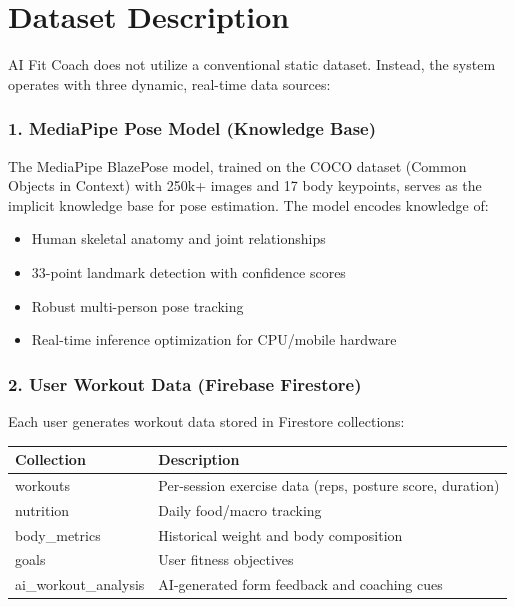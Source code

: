 \documentclass[12pt,a4paper]{article}
\begin{document}
\section{Dataset Description}

AI Fit Coach does not utilize a conventional static dataset. Instead, the system 
operates with three dynamic, real-time data sources:

\subsubsection*{1. MediaPipe Pose Model (Knowledge Base)}

The MediaPipe BlazePose model, trained on the COCO dataset (Common Objects in Context) 
with 250k+ images and 17 body keypoints, serves as the implicit knowledge base for 
pose estimation. The model encodes knowledge of:

\begin{itemize}[noitemsep, topsep=2pt]
  \item Human skeletal anatomy and joint relationships
  \item 33-point landmark detection with confidence scores
  \item Robust multi-person pose tracking
  \item Real-time inference optimization for CPU/mobile hardware
\end{itemize}

\subsubsection*{2. User Workout Data (Firebase Firestore)}

Each user generates workout data stored in Firestore collections:

\begin{longtable}{p{4.5cm} p{8cm}}
\toprule
\textbf{Collection} & \textbf{Description} \\
\midrule
\endhead
workouts & Per-session exercise data (reps, posture score, duration) \\
nutrition & Daily food/macro tracking \\
body\_metrics & Historical weight and body composition \\
goals & User fitness objectives \\
ai\_workout\_analysis & AI-generated form feedback and coaching cues \\
\bottomrule
\end{longtable}
\end{document}
